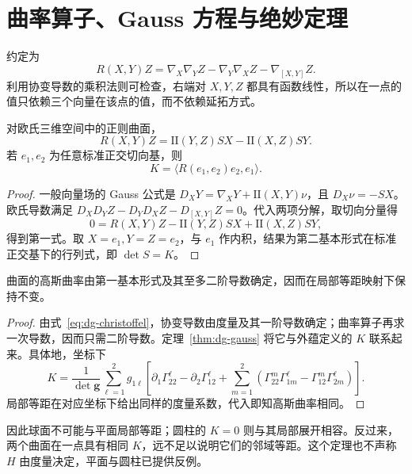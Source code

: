 \documentclass[UTF8,12pt,a4paper,fontset=fandol]{ctexbook}
\newcommand{\ip}[2]{\langle #1,#2\rangle}
\begin{document}
\section{曲率算子、Gauss 方程与绝妙定理}
\begin{definition}[曲率算子]
约定为
\[
 R(X,Y)Z=\nabla_X\nabla_YZ-\nabla_Y\nabla_XZ-\nabla_{[X,Y]}Z.
\]
利用协变导数的乘积法则可检查，右端对 $X,Y,Z$ 都具有函数线性，所以在一点的值只依赖三个向量在该点的值，而不依赖延拓方式。
\end{definition}

\begin{theorem}[Gauss 方程]
对欧氏三维空间中的正则曲面，
\begin{equation}
 R(X,Y)Z=\mathrm{II}(Y,Z)SX-\mathrm{II}(X,Z)SY.
 \label{eq:dg-gauss-equation}
\end{equation}
若 $e_1,e_2$ 为任意标准正交切向基，则
\begin{equation}
 K=\ip{R(e_1,e_2)e_2}{e_1}.
 \label{eq:dg-intrinsic-K}
\end{equation}
\label{thm:dg-gauss}
\end{theorem}
\begin{proof}
一般向量场的 Gauss 公式是 $D_XY=\nabla_XY+\mathrm{II}(X,Y)\nu$，且 $D_X\nu=-SX$。欧氏导数满足 $D_XD_YZ-D_YD_XZ-D_{[X,Y]}Z=0$。代入两项分解，取切向分量得
\[
 0=R(X,Y)Z-\mathrm{II}(Y,Z)SX+\mathrm{II}(X,Z)SY,
\]
得到第一式。取 $X=e_1,Y=Z=e_2$，与 $e_1$ 作内积，结果为第二基本形式在标准正交基下的行列式，即 $\det S=K$。
\end{proof}

\begin{theorem}
曲面的高斯曲率由第一基本形式及其至多二阶导数确定，因而在局部等距映射下保持不变。
\label{thm:dg-egregium}
\end{theorem}
\begin{proof}
由式~\eqref{eq:dg-christoffel}，协变导数由度量及其一阶导数确定；曲率算子再求一次导数，因而只需二阶导数。定理~\ref{thm:dg-gauss} 将它与外蕴定义的 $K$ 联系起来。具体地，坐标下
\begin{equation}
 K=\frac{1}{\det\mathbf g}\sum_{\ell=1}^2 g_{1\ell}
 \left[\partial_1\Gamma^\ell_{22}-\partial_2\Gamma^\ell_{12}
 +\sum_{m=1}^2\left(\Gamma^m_{22}\Gamma^\ell_{1m}
 -\Gamma^m_{12}\Gamma^\ell_{2m}\right)\right].
 \label{eq:dg-K-christoffel}
\end{equation}
局部等距在对应坐标下给出同样的度量系数，代入即知高斯曲率相同。
\end{proof}
因此球面不可能与平面局部等距；圆柱的 $K=0$ 则与其局部展开相容。反过来，两个曲面在一点具有相同 $K$，远不足以说明它们的邻域等距。这个定理也不声称 $H$ 由度量决定，平面与圆柱已提供反例。
\end{document}
